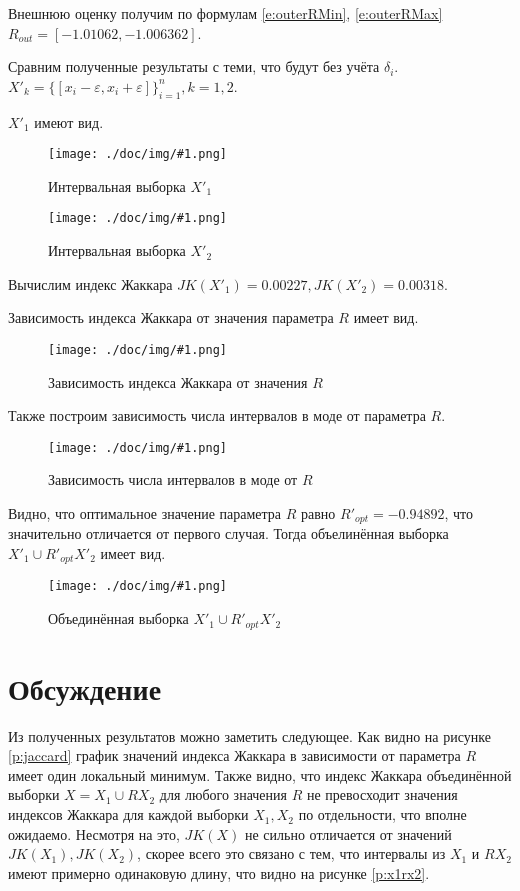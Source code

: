 \documentclass[a4paper,12pt]{article}
\newcommand{\plot}[3]{
    \begin{figure}[H]
        \begin{center}
            \texttt{[image: ./doc/img/\#1.png]}
            \caption{#2}
            \label{#3}
        \end{center}
    \end{figure}
}
\begin{document}
    Внешнюю оценку получим по формулам \ref{e:outerRMin}, \ref{e:outerRMax}
    $ R_{out} = [-1.01062, -1.006362] $.

    Сравним полученные результаты с теми, что будут без учёта $ \delta_i $.
    $ X'_k = \{[x_i - \varepsilon, x_i + \varepsilon]\}^n_{i=1}, k = 1,2 $.

    $ X'_1 $ имеют вид.
    \plot{werr_X1}{Интервальная выборка $ X'_1 $}{p:werrX1}
    \plot{werr_X2}{Интервальная выборка $ X'_2 $}{p:werrX2}
    Вычислим индекс Жаккара $ JK(X'_1) = 0.00227, JK(X'_2) = 0.00318 $.

    Зависимость индекса Жаккара от значения параметра $ R $ имеет вид.
    \plot{werr_Jaccard}{Зависимость индекса Жаккара от значения $ R $}{p:werrJaccard}

    Также построим зависимость числа интервалов в моде от параметра $ R $.
    \plot{werr_ModaR}{Зависимость числа интервалов в моде от $ R $}{p:werrModa}

    Видно, что оптимальное значение параметра $ R $ равно $ R'_{opt} = -0.94892 $,
    что значительно отличается от первого случая. 
    Тогда объелинённая выборка $ X'_1 \cup R'_{opt} X'_2 $ имеет вид.
    \plot{werr_X1RX2}{Объединённая выборка $ X'_1 \cup R'_{opt} X'_2 $}{p:werrX1RX2}

    \section{Обсуждение}
    \quad Из полученных результатов можно заметить следующее.
    Как видно на рисунке \ref{p:jaccard} график значений индекса Жаккара
    в зависимости от параметра $ R $ имеет один локальный минимум.
    Также видно, что индекс Жаккара объединённой выборки $ X = X_1 \cup R X_2 $ для любого значения $ R $
    не превосходит значения индексов Жаккара для каждой выборки $ X_1, X_2 $ по отдельности, что вполне ожидаемо.
    Несмотря на это, $ JK(X) $ не сильно отличается от значений $ JK(X_1), JK(X_2) $,
    скорее всего это связано с тем, что интервалы из $ X_1 $ и $ R X_2 $ имеют примерно одинаковую длину,
    что видно на рисунке \ref{p:x1rx2}.

\end{document}

